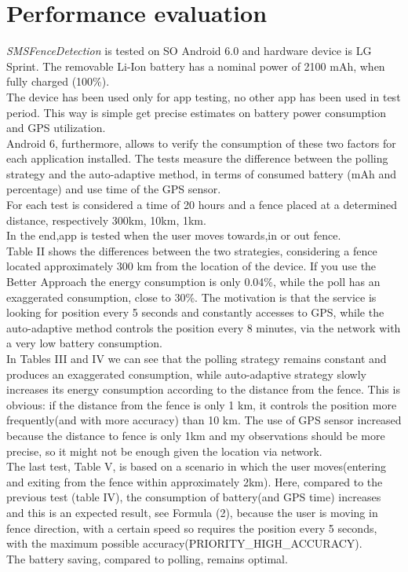 \documentclass[conference]{IEEEtran}
\begin{document}
\section{Performance evaluation}
\label{sec:performance}
\textit{SMSFenceDetection} is tested on SO Android 6.0 and hardware device is LG Sprint. The removable Li-Ion battery has a nominal power of 2100 mAh, when fully charged (100\%). \\
The device has been used only for app testing, no other app has been used in test period. This way is simple get precise estimates on battery power consumption and GPS utilization. \\
Android 6, furthermore, allows to verify the consumption of these two factors for each application installed.
The tests measure the difference between the polling strategy and the auto-adaptive method, in terms of consumed battery (mAh and percentage) and use time of the GPS sensor. \\
For each test is considered a time of 20 hours and a fence placed at a determined distance, respectively 300km, 10km, 1km.\\ 
In the end,app is tested when the user moves towards,in or out fence.\\
Table II shows the differences between the two strategies, considering a fence located approximately 300 km from the location of the device.
If you use the Better Approach the energy consumption is only 0.04\%, while the poll has an exaggerated consumption, close to 30\%.
The motivation is that the service is looking for position every 5 seconds and constantly accesses to GPS, 
while the auto-adaptive method controls the position every 8 minutes, via the network with a very low battery consumption. \\
In Tables III and IV we can see that the polling strategy remains constant and produces an exaggerated consumption, 
while auto-adaptive strategy slowly increases its energy consumption according to the distance from the fence.
This is obvious: if the distance from the fence is only 1 km, it controls the position more frequently(and with more accuracy) than 10 km.
The use of GPS sensor increased because the distance to fence is only 1km and my observations should be more precise, so it might not be enough given the location via network.\\
The last test, Table V, is based on a scenario in which the user moves(entering and exiting from the fence within approximately 2km). Here, compared to the previous test (table IV), 
the consumption of battery(and GPS time) increases and this is an expected result, see Formula (2), because the user is moving in fence direction, with a certain speed so
requires the position every 5 seconds, with the maximum possible accuracy(PRIORITY\_HIGH\_ACCURACY).\\
The battery saving, compared to polling, remains optimal.
\end{document}
